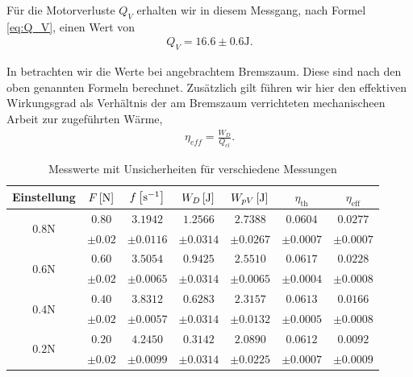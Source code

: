 Für die Motorverluste $Q_V$ erhalten wir in diesem Messgang, nach Formel \eqref{eq:Q_V}, einen Wert von
\begin{align}
    Q_V = 16.6 \pm 0.6 \si{\joule}.
\end{align}

In  betrachten wir die Werte bei angebrachtem Bremszaum. Diese sind nach den oben genannten Formeln berechnet. Zusätzlich gilt führen wir hier den effektiven Wirkungsgrad als Verhältnis der am Bremszaum verrichteten mechanischeen Arbeit zur zugeführten Wärme,
\begin{align}
    \eta_{eff} = \frac{W_D}{Q_{el}}.
\end{align}

\begin{table}[H]
    \centering
    \begin{tabular}{c c c c c c c}
    \toprule
    \textbf{Einstellung} & \boldmath$F\,\qty[\si{\newton}]$ & \boldmath$f\,\qty[\si{\per\second}]$ & \boldmath$W_D\,\qty[\si{\joule}]$ & \boldmath$W_{pV}\,\qty[\si{\joule}]$ & \boldmath$\eta_{\text{th}}$ & \boldmath$\eta_{\text{eff}}$ \\
    \midrule
    \multirow{2}{*}{\boldmath$0.8\si{\newton}$} & $0.80$ & $3.1942$ & $1.2566$ & $2.7388$ & $0.0604$ & $0.0277$ \\
     & $\pm 0.02$ & $\pm 0.0116$ & $\pm 0.0314$ & $\pm 0.0267$ & $\pm 0.0007$ & $\pm 0.0007$ \\
    \midrule
    \multirow{2}{*}{\boldmath$0.6\si{\newton}$} & $0.60$ & $3.5054$ & $0.9425$ & $2.5510$ & $0.0617$ & $0.0228$ \\
     & $\pm 0.02$ & $\pm 0.0065$ & $\pm 0.0314$ & $\pm 0.0065$ & $\pm 0.0004$ & $\pm 0.0008$ \\
    \midrule
    \multirow{2}{*}{\boldmath$0.4\si{\newton}$} & $0.40$ & $3.8312$ & $0.6283$ & $2.3157$ & $0.0613$ & $0.0166$ \\
     & $\pm 0.02$ & $\pm 0.0057$ & $\pm 0.0314$ & $\pm 0.0132$ & $\pm 0.0005$ & $\pm 0.0008$ \\
    \midrule
    \multirow{2}{*}{\boldmath$0.2\si{\newton}$} & $0.20$ & $4.2450$ & $0.3142$ & $2.0890$ & $0.0612$ & $0.0092$ \\
     & $\pm 0.02$ & $\pm 0.0099$ & $\pm 0.0314$ & $\pm 0.0225$ & $\pm 0.0007$ & $\pm 0.0009$ \\
    \bottomrule
    \end{tabular}
    \label{tab:werte_gebremst}
    \caption{Messwerte mit Unsicherheiten für verschiedene Messungen}
\end{table}

